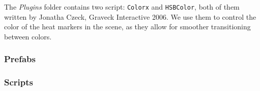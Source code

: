 The \textit{Plugins} folder contains two script: \texttt{Colorx} and \texttt{HSBColor}, both of them written by Jonatha Czeck, Graveck Interactive 2006. We use them to control the color of the heat markers in the scene, as they allow for smoother transitioning between colors.

\subsubsection*{Prefabs}
\label{Overview_Folder_Prefabs}



\subsubsection*{Scripts}
\label{Overview_Folder_Scripts}